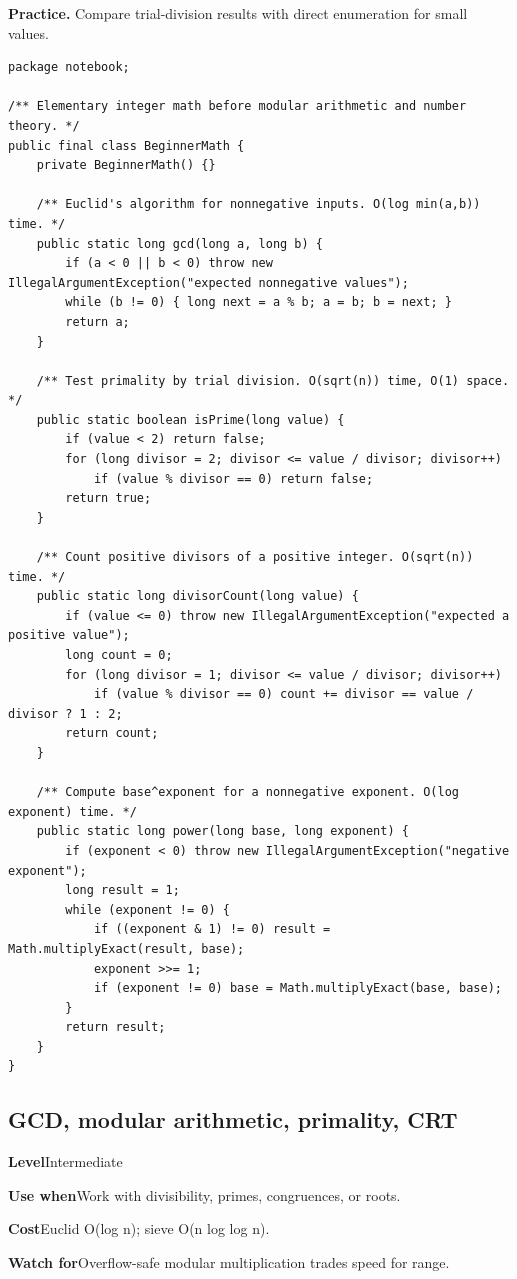 \documentclass[10pt,letterpaper]{article}
\newcommand{\entrylabel}[1]{\textcolor{accent}{\bfseries #1}}
\begin{document}
\noindent\textbf{Practice.} Compare trial-division results with direct enumeration for small values.\par
\begin{lstlisting}
package notebook;

/** Elementary integer math before modular arithmetic and number theory. */
public final class BeginnerMath {
    private BeginnerMath() {}

    /** Euclid's algorithm for nonnegative inputs. O(log min(a,b)) time. */
    public static long gcd(long a, long b) {
        if (a < 0 || b < 0) throw new IllegalArgumentException("expected nonnegative values");
        while (b != 0) { long next = a % b; a = b; b = next; }
        return a;
    }

    /** Test primality by trial division. O(sqrt(n)) time, O(1) space. */
    public static boolean isPrime(long value) {
        if (value < 2) return false;
        for (long divisor = 2; divisor <= value / divisor; divisor++)
            if (value % divisor == 0) return false;
        return true;
    }

    /** Count positive divisors of a positive integer. O(sqrt(n)) time. */
    public static long divisorCount(long value) {
        if (value <= 0) throw new IllegalArgumentException("expected a positive value");
        long count = 0;
        for (long divisor = 1; divisor <= value / divisor; divisor++)
            if (value % divisor == 0) count += divisor == value / divisor ? 1 : 2;
        return count;
    }

    /** Compute base^exponent for a nonnegative exponent. O(log exponent) time. */
    public static long power(long base, long exponent) {
        if (exponent < 0) throw new IllegalArgumentException("negative exponent");
        long result = 1;
        while (exponent != 0) {
            if ((exponent & 1) != 0) result = Math.multiplyExact(result, base);
            exponent >>= 1;
            if (exponent != 0) base = Math.multiplyExact(base, base);
        }
        return result;
    }
}
\end{lstlisting}
\subsection{GCD, modular arithmetic, primality, CRT}
\begin{guidebox}\small
\entrylabel{Level}\quad Intermediate\par
\entrylabel{Use when}\quad Work with divisibility, primes, congruences, or roots.\par
\entrylabel{Cost}\quad Euclid O(log n); sieve O(n log log n).\par
\entrylabel{Watch for}\quad Overflow-safe modular multiplication trades speed for range.\par
\end{guidebox}
\end{document}
